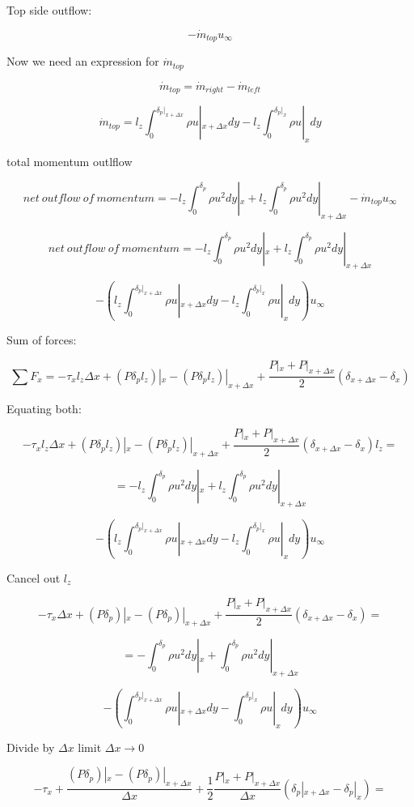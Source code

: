 \documentclass[11pt]{article}
\begin{document}
Top side outflow:

$$- \dot{m}_{top} u_\infty $$

Now we need an expression for $\dot{m}_{top}$

$$\dot{m}_{top} = \dot{m}_{right} - \dot{m}_{left}$$

$$\dot{m}_{top} = l_z \int_0^{\delta_p |_{x+\Delta x}} \rho u |_{x+ \Delta x}dy -  l_z \int_0^{\delta_p |_{x}} \rho u |_{x}dy$$

total momentum outlflow

$$net \ outflow \ of  \ momentum = - l_z \int_0^{\delta_p} \rho u^2 dy |_x +  l_z \int_0^{\delta_p} \rho u^2 dy |_{x+\Delta x} - \dot{m}_{top} u_\infty  $$

$$net \ outflow \ of  \ momentum = - l_z \int_0^{\delta_p} \rho u^2 dy |_x +  l_z \int_0^{\delta_p} \rho u^2 dy |_{x+\Delta x} $$

$$ - ( l_z \int_0^{\delta_p |_{x+\Delta x}} \rho u |_{x+ \Delta x}dy -  l_z \int_0^{\delta_p |_{x}} \rho u |_{x}dy) u_\infty  $$

Sum of forces:

$$\sum F_x = -\tau_x l_z \Delta x + (P \delta_p l_z)|_x - (P \delta_p l_z)|_{x+\Delta x} + \frac{P|_x + P|_{x+\Delta x}}{2} (\delta_{x+\Delta x} - \delta_{x}) $$

Equating both:

$$-\tau_x l_z \Delta x + (P \delta_p l_z)|_x -  (P \delta_p l_z)|_{x+\Delta x} + \frac{P|_x + P|_{x+\Delta x}}{2} (\delta_{x+\Delta x} - \delta_{x}) l_z= $$

$$= - l_z \int_0^{\delta_p} \rho u^2 dy |_x +  l_z \int_0^{\delta_p} \rho u^2 dy |_{x+\Delta x} $$

$$ - ( l_z \int_0^{\delta_p |_{x+\Delta x}} \rho u |_{x+ \Delta x}dy -  l_z \int_0^{\delta_p |_{x}} \rho u |_{x}dy) u_\infty  $$

Cancel out $l_z$

$$-\tau_x \Delta x + (P \delta_p )|_x -  (P \delta_p )|_{x+\Delta x} + \frac{P|_x + P|_{x+\Delta x}}{2} (\delta_{x+\Delta x} - \delta_{x}) = $$

$$= - \int_0^{\delta_p} \rho u^2 dy |_x +   \int_0^{\delta_p} \rho u^2 dy |_{x+\Delta x} $$

$$ - (  \int_0^{\delta_p |_{x+\Delta x}} \rho u |_{x+ \Delta x}dy -  \int_0^{\delta_p |_{x}} \rho u |_{x}dy) u_\infty  $$

Divide by $\Delta x$ limit $\Delta x \rightarrow 0 $


$$-\tau_x   + \frac{(P \delta_p )|_x -  (P \delta_p )|_{x+\Delta x}}{\Delta x}  + \frac{1}{2} \frac{P|_x + P|_{x+\Delta x}}{\Delta x} (\delta_p|_{x+\Delta x} - \delta_p|_{x}) = $$
\end{document}
